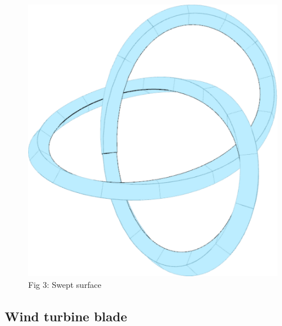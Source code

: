 \documentclass[landscape]{sintefposter}
\begin{document}
\begin{multicols}{3}
\begin{figure}[h!]
\begin{minipage}[b]{0.65\linewidth}
\begin{tcolorbox}[colback=sinteflightgrey]
\begin{Verbatim}[fontsize=\footnotesize]
      \end{Verbatim}
    \end{tcolorbox}
  \end{minipage}
  \begin{minipage}[b]{0.28\linewidth}
    \begin{center}
      \includegraphics[width=.9\textwidth]{trefoil}
        \small{Fig 3: Swept surface}
    \end{center}
  \end{minipage}
\end{figure}

\vspace{4cm}
\subsection{Wind turbine blade}


\end{multicols}
\end{document}
